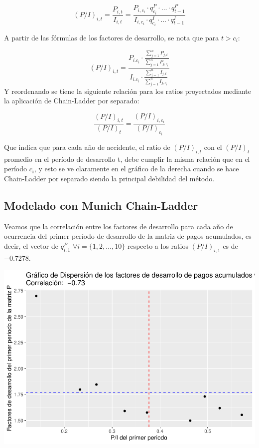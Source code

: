 \documentclass[
  12pt,
]{article}
\begin{document}
\[
(P/I)_{i,t} = \frac{P_{i,t}}{I_{i,t}} = \frac{P_{i,c_i}\cdot q_{c_i}^P \cdot \ldots \cdot q_{t-1}^P}{I_{i,c_i}\cdot q_{c_i}^I \cdot \ldots \cdot q_{t-1}^I}
\]

A partir de las fórmulas de los factores de desarrollo, se nota que para
\(t>c_i\):

\[
(P/I)_{i,t} = \frac{P_{i.c_i}\cdot \frac{\sum_{j=1}^n P_{j,t}}{\sum_{j=1}^n P_{j,c_i}}}{I_{i.c_i}\cdot \frac{\sum_{j=1}^n I_{j,t}}{\sum_{j=1}^n I_{j,c_i}}}
\] Y reordenando se tiene la siguiente relación para los ratios
proyectados mediante la aplicación de Chain-Ladder por separado:

\[
\frac{(P/I)_{i,t}}{(P/I)_t} = \frac{(P/I)_{i,c_i}}{(P/I)_{c_i}}
\]

Que indica que para cada año de accidente, el ratio de \((P/I)_{i,t}\)
con el \((P/I)_t\) promedio en el período de desarrollo t, debe cumplir
la misma relación que en el período \(c_i\), y esto se ve claramente en
el gráfico de la derecha cuando se hace Chain-Ladder por separado siendo
la principal debilidad del método.

\hypertarget{modelado-con-munich-chain-ladder}{%
\subsection{Modelado con Munich
Chain-Ladder}\label{modelado-con-munich-chain-ladder}}

Veamos que la correlación entre los factores de desarrollo para cada año
de ocurrencia del primer período de desarrollo de la matriz de pagos
acumulados, es decir, el vector de \(q_{i,1}^P\)
\(\forall i = \{1,2,\ldots,10\}\) respecto a los ratios \((P/I)_{i,1}\)
es de \(-0.7278\).

\includegraphics{informe_files/figure-latex/unnamed-chunk-24-1.pdf}
\end{document}
